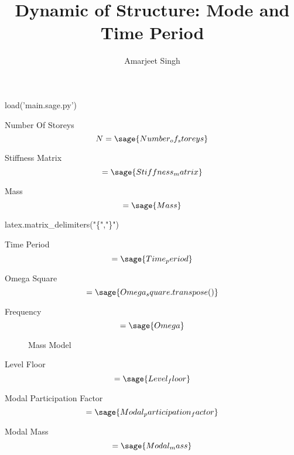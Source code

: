 \documentclass[12pt]{report}
\title{Dynamic of Structure: Mode and Time Period}
\author{Amarjeet Singh }
\begin{document}
\setcounter{chapter}{1}
\thispagestyle{plain}
	\begin{titlepage}
\maketitle
	\end{titlepage}

\begin{sagesilent}
	load('main.sage.py')

\end{sagesilent}

Number Of Storeys
\begin{equation}
	N = \sage{Number_of_storeys}
\end{equation}

Stiffness Matrix
\begin{equation}
	[K]=\sage{Stiffness_matrix}
\end{equation}

Mass
\begin{equation}
	 [M]=\sage{Mass}
\end{equation}


\begin{sagesilent}
latex.matrix_delimiters("\{","\}")
\end{sagesilent}

Time Period
\begin{equation}
	[T]=\sage{Time_period}
\end{equation}

Omega Square
\begin{equation}
	[\omega^2] =\sage{Omega_square.transpose()}
\end{equation}

Frequency
\begin{equation}
	[\omega]=\sage{Omega}
\end{equation}

\begin{figure}
	\caption{Mass Model}
\end{figure}

Level Floor
\begin{equation}
	[L]=\sage{Level_floor}
\end{equation}

Modal Participation Factor
\begin{equation}
	 [p]=\sage{Modal_participation_factor}
\end{equation}

Modal Mass
\begin{equation}
	 [M_{{m}}]=\sage{Modal_mass}
\end{equation}
\end{document}
